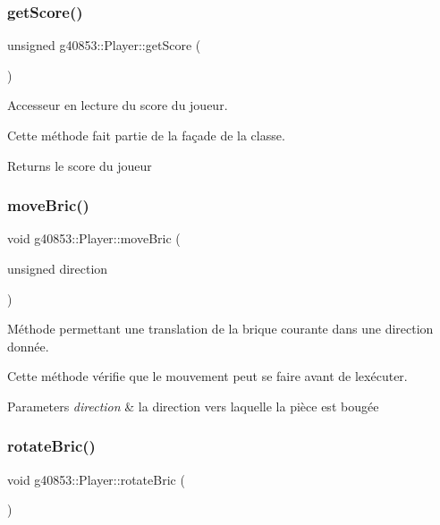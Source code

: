 \subsubsection{\texorpdfstring{get\+Score()}{getScore()}}
{\footnotesize\ttfamily unsigned g40853\+::\+Player\+::get\+Score (\begin{DoxyParamCaption}{ }\end{DoxyParamCaption})\hspace{0.3cm}{\ttfamily [inline]}}



Accesseur en lecture du score du joueur. 

Cette méthode fait partie de la façade de la classe.

\begin{DoxyReturn}{Returns}
le score du joueur 
\end{DoxyReturn}
\hypertarget{classg40853_1_1_player_a339a715391f735caea26d1edee506597}{}\label{classg40853_1_1_player_a339a715391f735caea26d1edee506597} 
\subsubsection{\texorpdfstring{move\+Bric()}{moveBric()}}
{\footnotesize\ttfamily void g40853\+::\+Player\+::move\+Bric (\begin{DoxyParamCaption}\item[{unsigned}]{direction }\end{DoxyParamCaption})}



Méthode permettant une translation de la brique courante dans une direction donnée. 

Cette méthode vérifie que le mouvement peut se faire avant de l\textquotesingle{}exécuter.


\begin{DoxyParams}{Parameters}
{\em direction} & la direction vers laquelle la pièce est bougée \\
\hline
\end{DoxyParams}
\hypertarget{classg40853_1_1_player_aab6c92f90be4da07d3c6cc612de2390e}{}\label{classg40853_1_1_player_aab6c92f90be4da07d3c6cc612de2390e} 
\subsubsection{\texorpdfstring{rotate\+Bric()}{rotateBric()}}
{\footnotesize\ttfamily void g40853\+::\+Player\+::rotate\+Bric (\begin{DoxyParamCaption}{ }\end{DoxyParamCaption})}



